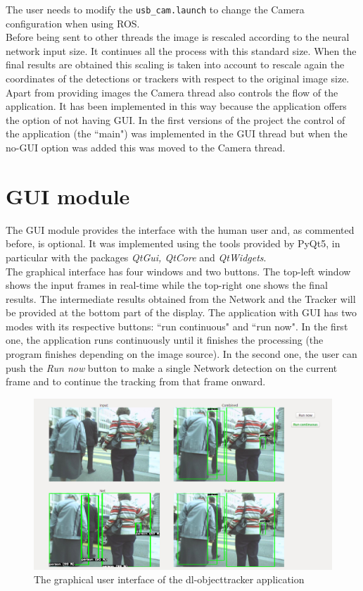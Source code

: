 The user needs to modify the \texttt{usb\_cam.launch} to change the Camera configuration when using ROS.\\
Before being sent to other threads the image is rescaled according to the neural network input size. It continues all the process with this standard size. When the final results are obtained this scaling is taken into account to rescale again the coordinates of the detections or trackers with respect to the original image size.\\
Apart from providing images the Camera thread also controls the flow of the application. It has been implemented in this way because the application offers the option of not having GUI. In the first versions of the project the control of the application (the ``main") was implemented in the GUI thread but when the no-GUI option was added this was moved to the Camera thread.\\

\section{GUI module}
The GUI module provides the interface with the human user and, as commented before, is optional. It was implemented using the tools provided by PyQt5, in particular with the packages \textit{QtGui, QtCore} and \textit{QtWidgets}.\\
The graphical interface has four windows and two buttons. The top-left window shows the input frames in real-time while the top-right one shows the final results. The intermediate results obtained from the Network and the Tracker will be provided at the bottom part of the display. The application with GUI has two modes with its respective buttons: ``run continuous" and ``run now". In the first one, the application runs continuously until it finishes the processing (the program finishes depending on the image source). In the second one, the user can push the \textit{Run now} button to make a single Network detection on the current frame and to continue the tracking from that frame onward.
\begin{figure}[H]
\begin{center}
\includegraphics[scale=0.35]{figures/gui.png}
\caption{The graphical user interface of the dl-objecttracker application}
\label{fig:gui}
\end{center}
\end{figure} 
